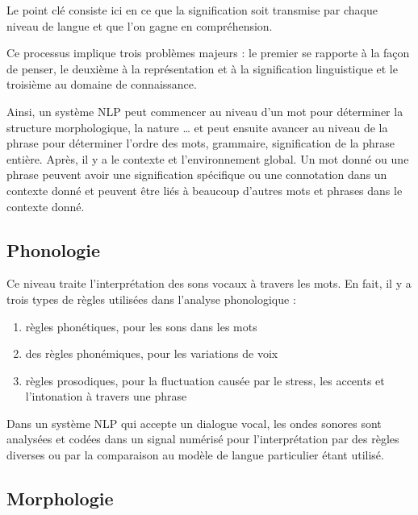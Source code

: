 Le point clé consiste ici en ce que la signification soit transmise par chaque niveau de langue et que l'on gagne en compréhension.
\vspace{1em}

	Ce processus implique trois problèmes majeurs : le premier se rapporte à la façon de penser, le deuxième à la représentation et à la signification linguistique et le troisième au domaine de connaissance.
	\vspace{1em}
	
	 Ainsi, un système NLP peut commencer au niveau d’un mot pour déterminer la structure morphologique, la nature … et peut ensuite avancer au niveau de la phrase pour déterminer l'ordre des mots, grammaire, signification de la phrase entière. Après, il y a le contexte et l'environnement global. Un mot donné ou une phrase peuvent avoir une signification spécifique ou une connotation dans un contexte donné et peuvent être liés à beaucoup d'autres mots et phrases dans le contexte donné.
	\vspace{1em}

\subsection{Phonologie}

	Ce niveau traite l'interprétation des sons vocaux à travers les mots. En fait, il y a trois types de règles utilisées dans l'analyse phonologique : 
	\vspace{1em}
	
	\begin{enumerate}
		\item règles phonétiques, pour les sons dans les mots
		\item des règles phonémiques, pour les variations de voix
		\item règles prosodiques, pour la fluctuation causée par le stress, les accents et l’intonation à travers une phrase
	\end{enumerate} 
\vspace{1em}

	Dans un système NLP qui accepte un dialogue vocal, les ondes sonores sont analysées et codées dans un signal numérisé pour l'interprétation par des règles diverses ou par la comparaison au modèle de langue particulier étant utilisé.

\subsection{Morphologie}

